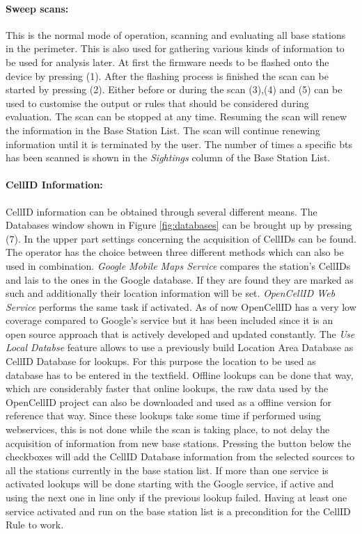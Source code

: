 \paragraph{Sweep scans:} This is the normal mode of operation, scanning and evaluating all base stations in the perimeter.
This is also used for gathering various kinds of information to be used for analysis later.
At first the firmware needs to be flashed onto the device by pressing (1).
After the flashing process is finished the scan can be started by pressing (2).
Either before or during the scan (3),(4) and (5) can be used to customise the output or rules that should be considered during evaluation.
The scan can be stopped at any time.
Resuming the scan will renew the information in the Base Station List.
The scan will continue renewing information until it is terminated by the user.
The number of times a specific \gls{bts} has been scanned is shown in the \emph{Sightings} column of the Base Station List.

\paragraph{CellID Information:} CellID information can be obtained through several different means.
The Databases window shown in Figure \ref{fig:databases} can be brought up by pressing (7).
In the upper part settings concerning the acquisition of CellIDs can be found.
The operator has the choice between three different methods which can also be used in combination.
\emph{Google Mobile Maps Service} compares the station's CellIDs and \glspl{lai} to the ones in the Google database.
If they are found they are marked as such and additionally their location information will be set.
\emph{OpenCellID Web Service} performs the same task if activated.
As of now OpenCellID has a very low coverage compared to Google's service but it has been included since it is an open source approach that is actively developed and updated constantly.
The \emph{Use Local Databse} feature allows to use a previously build Location Area Database as CellID Database for lookups.
For this purpose the location to be used as database has to be entered in the textfield.
Offline lookups can be done that way, which are considerably faster that online lookups, the raw data used by the OpenCellID project can also be downloaded and used as a offline version for reference that way.
Since these lookups take some time if performed using webservices, this is not done while the scan is taking place, to not delay the acquisition of information from new base stations.
Pressing the button below the checkboxes will add the CellID Database information from the selected sources to all the stations currently in the base station list.
If more than one service is activated lookups will be done starting with the Google service, if active and using the next one in line only if the previous lookup failed.
Having at least one service activated and run on the base station list is a precondition for the CellID Rule to work.


